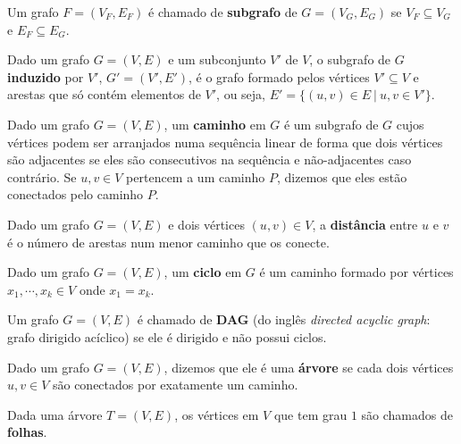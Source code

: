 \begin{definition}[subgrafo]
  Um grafo $F = (V_F, E_F)$ é chamado de \textbf{subgrafo} de $G = (V_G, E_G)$ se $V_F \subseteq V_G$ e $E_F \subseteq E_G$.
\end{definition}

\begin{definition}
  Dado um grafo $G = (V, E)$ e um subconjunto $V'$ de $V$, o subgrafo de $G$ \textbf{induzido} por $V'$, $G' = (V', E')$, é o grafo formado pelos vértices $V' \subseteq V$ e arestas que só contém elementos de $V'$, ou seja, $E' = \{(u, v) \in E \ | \  u, v \in V'\}$.
\end{definition}

\begin{definition}[caminho]
  Dado um grafo $G = (V, E)$, um \textbf{caminho} em $G$ é um subgrafo de $G$ cujos vértices podem ser arranjados numa sequência linear de forma que dois vértices são adjacentes se eles são consecutivos na sequência e não-adjacentes caso contrário. Se $u, v \in V$ pertencem a um caminho $P$, dizemos que eles estão conectados pelo caminho $P$.
\end{definition}

\begin{definition}[distância]
  Dado um grafo $G = (V, E)$ e dois vértices $(u, v) \in V$, a \textbf{distância} entre $u$ e $v$ é o número de arestas num menor caminho que os conecte.
\end{definition}

\begin{definition}[ciclo]
  Dado um grafo $G = (V, E)$, um \textbf{ciclo} em $G$ é um caminho formado por vértices $x_1, \cdots, x_k \in V$ onde $x_1 = x_k$.
\end{definition}

\begin{definition}[DAG]
  Um grafo $G = (V, E)$ é chamado de \textbf{DAG} (do inglês \emph{directed acyclic graph}: grafo dirigido acíclico) se ele é dirigido e não possui ciclos.
\end{definition}

\begin{definition}[árvore]
  Dado um grafo $G = (V, E)$, dizemos que ele é uma \textbf{árvore} se cada dois vértices $u, v \in V$ são conectados por exatamente um caminho.
\end{definition}

Dada uma árvore $T = (V, E)$, os vértices em $V$ que tem grau $1$ são chamados de \textbf{folhas}.

